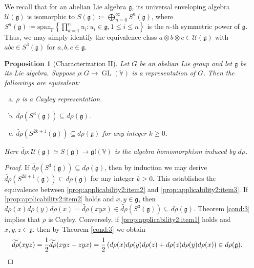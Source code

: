 \documentclass[11pt,reqno]{amsart}
\DeclareMathOperator{\GL}{GL}
\newtheorem{proposition}[theorem]{Proposition}
\newcommand{\FF}{\mathbb{F}} %
\newcommand{\spn}{\mathrm{span}}
\begin{document}
We recall that for an abelian Lie algebra $\mathfrak{g}$,  its universal enveloping algebra $\mathcal{U}(\mathfrak{g})$ is isomorphic to $S(\mathfrak{g}) \coloneqq \bigoplus_{n=0}^\infty S^n(\mathfrak{g})$,  where $S^n (\mathfrak{g}) \coloneqq \spn_\FF\left\{\prod_{k=1}^{n} u_i: u_i \in \mathfrak{g},  1\le  i \le n \right\}$ is the $n$-th symmetric power of $\mathfrak{g}$.  Thus,  we may simply identify the equivalence class $\overline{a \otimes b \otimes c} \in \mathcal{U}(\mathfrak{g})$ with $abc \in S^3(\mathfrak{g})$ for $a,b,c\in \mathfrak{g}$.  
\begin{proposition}[Characterization II]\label{prop:applicability2}
Let $G$ be an abelian Lie group and let $\mathfrak{g}$ be its Lie algebra.  Suppose $\rho: G \to \GL(\mathbb{V})$ is a representation of $G$.  Then the followings are equivalent:
\begin{enumerate}[(a)]
\item $\rho$ is a Cayley representation. \label{prop:applicability2:item1}
\item $\widetilde{d\rho} \left( S^3(\mathfrak{g}) \right) \subseteq d\rho(\mathfrak{g})$. \label{prop:applicability2:item2}
\item $\widetilde{d\rho}\left( S^{2k+1}(\mathfrak{g}) \right) \subseteq d\rho(\mathfrak{g})$ for any integer $k\ge 0$. \label{prop:applicability2:item3}
\end{enumerate}
Here $\widetilde{d\rho}:\mathcal{U} (\mathfrak{g})\simeq S(\mathfrak{g}) \to \mathfrak{gl}(\mathbb{V})$ is the algebra homomorphism induced by $d\rho$.
    \end{proposition}
    \begin{proof}
If $\widetilde{d\rho} \left( S^3(\mathfrak{g}) \right) \subseteq d\rho(\mathfrak{g})$,  then by induction we may derive $\widetilde{d\rho}\left( S^{2k+1}(\mathfrak{g}) \right) \subseteq d\rho(\mathfrak{g})$ for any integer $k\geq 0$.  This establishes the equivalence between \eqref{prop:applicability2:item2} and \eqref{prop:applicability2:item3}.  If \eqref{prop:applicability2:item2} holds and $x,y \in \mathfrak{g}$,  then $d\rho(x)d\rho(y)d\rho(x) = \widetilde{d\rho}(xyx)\in \widetilde{d\rho} \left( S^3(\mathfrak{g}) \right)\subseteq d\rho(\mathfrak{g})$.  Theorem \ref{cond:3} implies that $\rho$ is Cayley.  Conversely,  if \eqref{prop:applicability2:item1} holds and $x,y,z\in \mathfrak{g}$,  then by Theorem \ref{cond:3} we obtain
\[
\widetilde{d\rho} (xyz)=\frac{1}{2} \widetilde{d\rho} (xyz + zyx) =\frac{1}{2}\left( d\rho (x)  d\rho (y) d\rho (z)  + d\rho (z)  d\rho (y) d\rho (x) \right) \in d\rho (\mathfrak{g}). \qedhere
\]
\end{proof}
\end{document}
